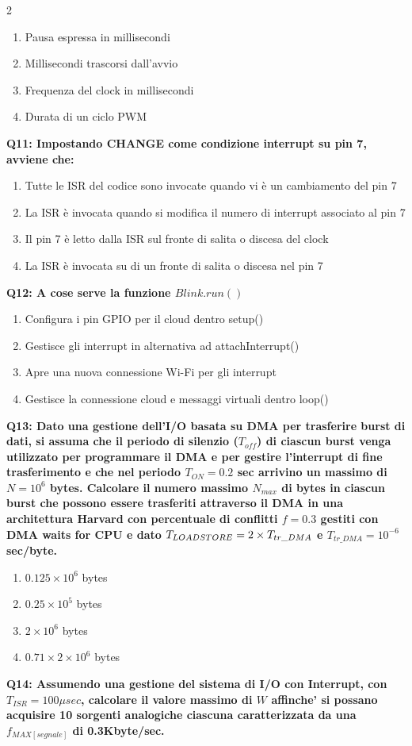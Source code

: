 \documentclass[10pt]{article}
\begin{document}
\begin{multicols}{2}
\begin{enumerate}[label=\arabic*.]
\item Pausa espressa in millisecondi
\item Millisecondi trascorsi dall'avvio
\item Frequenza del clock in millisecondi
\item Durata di un ciclo PWM
\end{enumerate}
\textbf{Q11: Impostando CHANGE come condizione interrupt su pin 7, avviene che:}

\begin{enumerate}[label=\arabic*.]
\item Tutte le ISR del codice sono invocate quando vi è un cambiamento del pin 7
\item La ISR è invocata quando si modifica il numero di interrupt associato al pin 7
\item Il pin 7 è letto dalla ISR sul fronte di salita o discesa del clock
\item La ISR è invocata su di un fronte di salita o discesa nel pin 7
\end{enumerate}
\textbf{Q12: A cose serve la funzione $Blink.run()$}

\begin{enumerate}[label=\arabic*.]
\item Configura i pin GPIO per il cloud dentro setup()
\item Gestisce gli interrupt in alternativa ad attachInterrupt()
\item Apre una nuova connessione Wi-Fi per gli interrupt
\item Gestisce la connessione cloud e messaggi virtuali dentro loop()
\end{enumerate}
\textbf{Q13: Dato una gestione dell’I/O basata su DMA per trasferire burst di dati, si assuma che il periodo di silenzio  ($T_{off}$) di ciascun burst venga utilizzato per programmare il DMA e per gestire l’interrupt di fine trasferimento e che nel periodo $T_{ON} = 0.2$ sec arrivino un massimo di $N=10^6$ bytes. Calcolare il numero massimo $N_{max}$ di bytes in ciascun burst che possono essere trasferiti attraverso il DMA in una architettura Harvard con percentuale di conflitti $f = 0.3$ gestiti con DMA waits for CPU e dato $T_{LOAD\/STORE} = 2 \times T_{tr\_DMA}$ e $T_{tr\_DMA} = 10^{-6}$ sec/byte.}

\begin{enumerate}[label=\arabic*.]
\item $0.125 \times 10^6$ bytes
\item $0.25 \times 10^5$ bytes
\item $2 \times 10^6$ bytes
\item $0.71 \times 2 \times 10^6$ bytes
\end{enumerate}
\textbf{Q14: Assumendo una gestione del sistema di I/O con Interrupt, con $T_{ISR}=100\mu sec$, calcolare il valore massimo di $W$ affinche' si possano acquisire 10 sorgenti analogiche ciascuna caratterizzata da una $f_{MAX[segnale]}$ di 0.3Kbyte/sec.}


\end{multicols}
\end{document}
